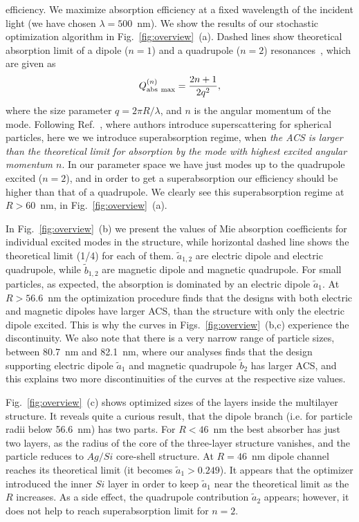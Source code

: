 \documentclass[aps,prl,twocolumn,showpacs,superscriptaddress,groupedaddress]{revtex4-1}
\begin{document}
efficiency. We maximize absorption efficiency at a fixed wavelength of
the incident light (we have chosen $\lambda=500$~nm). We show the
results of our stochastic optimization algorithm in
Fig.~\ref{fig:overview}~(a).  Dashed lines show theoretical absorption
limit of a dipole ($n=1$) and a quadrupole ($n=2$)
resonances~\cite{Tribelsky-2011}, which are given as $$Q^{(n)}_{\rm
  abs\ max}=\frac{2n+1}{2q^2},$$ where the size parameter $q=2\pi
R/\lambda$, and $n$ is the angular momentum of the mode. Following
Ref.~\cite{Fan-2011}, where authors introduce superscattering for
spherical particles, here we we introduce superabsorption regime,
when {\em the ACS is larger than the theoretical limit for absorption
  by the mode with highest excited angular momentum $n$}. In our
parameter space we have just modes up to the quadrupole excited
($n=2$), and in order to get a superabsorption our efficiency should
be higher than that of a quadrupole. We clearly see this
superabsorption regime at $R>60$~nm, in Fig.~\ref{fig:overview}~(a).

In Fig.~\ref{fig:overview}~(b) we present the values of Mie absorption
coefficients for individual excited modes in the structure, while
horizontal dashed line shows the theoretical limit (1/4) for each of
them. $\tilde{a}_{1,2}$ are electric dipole and electric quadrupole,
while $\tilde{b}_{1,2}$ are magnetic dipole and magnetic
quadrupole. For small particles, as expected, the absorption is
dominated by an electric dipole $\tilde{a}_1$.  At $R > 56.6$~nm the
optimization procedure finds that the designs with both electric and
magnetic dipoles have larger ACS, than the structure with only the
electric dipole excited. This is why the curves in
Figs.~\ref{fig:overview}~(b,c) experience the discontinuity. We also
note that there is a very narrow range of particle sizes, between
80.7~nm and 82.1~nm, where our analyses finds that the design
supporting electric dipole $\tilde{a}_1$ and magnetic quadrupole
$\tilde{b}_2$ has larger ACS, and this explains two more
discontinuities of the curves at the respective size values.

Fig.~\ref{fig:overview}~(c) shows optimized sizes of the layers inside
the multilayer structure. It reveals quite a curious result, that the
dipole branch (i.e. for particle radii below 56.6~nm) has two
parts. For $R<46$~nm the best absorber has just two layers, as the
radius of the core of the three-layer structure vanishes, and the
particle reduces to $Ag/Si$ core-shell structure.  At $R=46$~nm dipole
channel reaches its theoretical limit (it becomes
$\tilde{a}_1>0.249$).  It appears that the optimizer introduced the
inner $Si$ layer in order to keep $\tilde{a}_1$ near the theoretical
limit as the $R$ increases.  As a side effect, the quadrupole
contribution $\tilde{a}_2$ appears; however, it does not help to reach
superabsorption limit for $n=2$.
\end{document}
